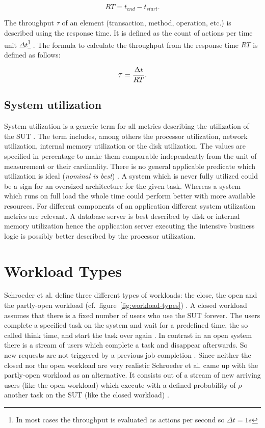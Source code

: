 \[
  RT = t_{end} - t_{start} .
\]

The throughput \large{$\tau$}\normalsize{} of an element (transaction, method, operation, etc.) is described using the response time. It is defined as the count of actions per time unit $\Delta t$\footnote{In most cases the throughput is evaluated as actions per second so $\Delta t = 1s$} \cite[19]{lilja.2005}. The formula to calculate the throughput from the response time $RT$ is defined as follows:

\[
  \mathlarger{\tau} = \frac{\Delta t}{RT} .
\]

\subsection*{System utilization}
System utilization is a generic term for all metrics describing the utilization of the \acf{SUT} \cite[48]{jain.2008}. The term includes, among others the processor utilization, network utilization, internal memory utilization or the disk utilization. The values are specified in percentage to make them comparable independently from the unit of measurement or their cardinality. There is no general applicable predicate which utilization is ideal (\emph{nominal is best}) \cite[54]{jain.2008}. A system which is never fully utilized could be a sign for an oversized architecture for the given task. Whereas a system which runs on full load the whole time could perform better with more available resources. For different components of an application different system utilization metrics are relevant. A database server is best described by disk or internal memory utilization hence the application server executing the intensive business logic is possibly better described by the processor utilization.

\section{Workload Types}
\label{sec:workloads}
Schroeder et al. define three different types of workloads: the close, the open and the partly-open workload (cf.~figure~\ref{fig:workload-types}) \cite{Schroeder.2006}. A closed workload assumes that there is a fixed number of users who use the \ac{SUT} forever. The users complete a specified task on the system and wait for a predefined time, the so called think time, and start the task over again \cite[3]{Schroeder.2006}. In contrast in an open system there is a stream of users which complete a task and disappear afterwards. So new requests are not triggered by a previous job completion \cite[3]{Schroeder.2006}. Since neither the closed nor the open workload are very realistic Schroeder et al. came up with the partly-open workload as an alternative. It consists out of a stream of new arriving users (like the open workload) which execute with a defined probability of $\rho$ another task on the \ac{SUT} (like the closed workload) \cite[3 - 4]{Schroeder.2006}.

